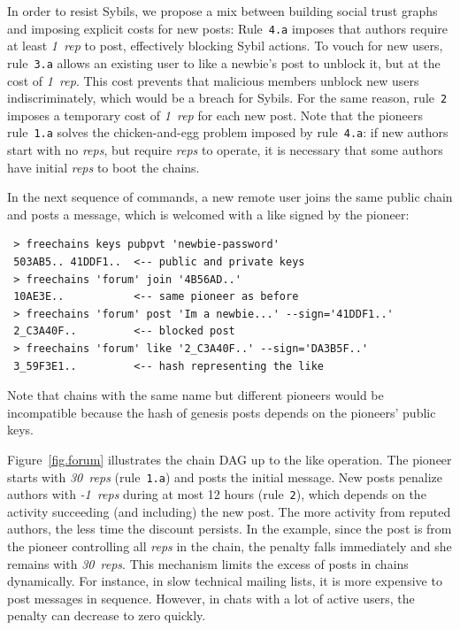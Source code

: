 \documentclass[12pt]{article}
\newcommand{\reps}     {\emph{reps}\xspace}
\newcommand{\onerep}   {\emph{1~rep}\xspace}
\newcommand{\nreps}[1] {\emph{#1~reps\xspace}}
\newcommand{\code}[1]  {\texttt{\footnotesize{#1}}}
\begin{document}
%
%
In order to resist Sybils, we propose a mix between building social trust
graphs and imposing explicit costs for new posts:
Rule~\code{4.a} imposes that authors require at least \onerep to post,
effectively blocking Sybil actions.
To vouch for new users, rule~\code{3.a} allows an existing user to like a
newbie's post to unblock it, but at the cost of \onerep.
This cost prevents that malicious members unblock new users indiscriminately,
which would be a breach for Sybils.
For the same reason, rule~\code{2} imposes a temporary cost of \onerep for
each new post.
%
Note that the pioneers rule~\code{1.a} solves the chicken-and-egg problem
imposed by rule~\code{4.a}: if new authors start with no \reps, but require
\reps to operate, it is necessary that some authors have initial \reps to boot
the chains.

In the next sequence of commands, a new remote user joins the same public chain
and posts a message, which is welcomed with a like signed by the pioneer:

{\footnotesize
\begin{verbatim}
 > freechains keys pubpvt 'newbie-password'
 503AB5.. 41DDF1..  <-- public and private keys
 > freechains 'forum' join '4B56AD..'
 10AE3E..           <-- same pioneer as before
 > freechains 'forum' post 'Im a newbie...' --sign='41DDF1..'
 2_C3A40F..         <-- blocked post
 > freechains 'forum' like '2_C3A40F..' --sign='DA3B5F..'
 3_59F3E1..         <-- hash representing the like
\end{verbatim}
}

Note that chains with the same name but different pioneers would be
incompatible because the hash of genesis posts depends on the pioneers' public
keys.

Figure~\ref{fig.forum} illustrates the chain DAG up to the like operation.
The pioneer starts with \nreps{30} (rule~\code{1.a}) and posts the initial
message.
%
New posts penalize authors with \nreps{-1} during at most 12 hours
(rule~\code{2}), which depends on the activity succeeding (and including) the
new post.
The more activity from reputed authors, the less time the discount persists.
In the example, since the post is from the pioneer controlling all \reps in the
chain, the penalty falls immediately and she remains with \nreps{30}.
This mechanism limits the excess of posts in chains dynamically.
For instance, in slow technical mailing lists, it is more expensive to post
messages in sequence.
However, in chats with a lot of active users, the penalty can decrease to zero
quickly.
\end{document}
